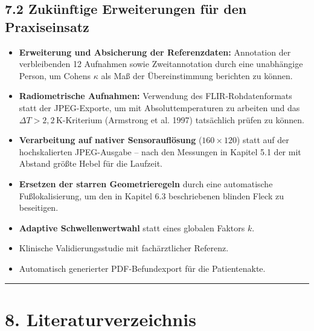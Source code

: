 \documentclass[
  11pt,
]{article}
\providecommand{\tightlist}{%
  \setlength{\itemsep}{0pt}\setlength{\parskip}{0pt}}
\begin{document}
\subsection{7.2 Zukünftige Erweiterungen für den
Praxiseinsatz}\label{zukuxfcnftige-erweiterungen-fuxfcr-den-praxiseinsatz}

\begin{itemize}
\tightlist
\item
  \textbf{Erweiterung und Absicherung der Referenzdaten:} Annotation der
  verbleibenden 12 Aufnahmen sowie Zweitannotation durch eine
  unabhängige Person, um Cohens \(\kappa\) als Maß der Übereinstimmung
  berichten zu können.
\item
  \textbf{Radiometrische Aufnahmen:} Verwendung des FLIR-Rohdatenformats
  statt der JPEG-Exporte, um mit Absoluttemperaturen zu arbeiten und das
  \(\Delta T > 2{,}2\,\)K-Kriterium (Armstrong et al. 1997) tatsächlich
  prüfen zu können.
\item
  \textbf{Verarbeitung auf nativer Sensorauflösung} (\(160 \times 120\))
  statt auf der hochskalierten JPEG-Ausgabe -- nach den Messungen in
  Kapitel 5.1 der mit Abstand größte Hebel für die Laufzeit.
\item
  \textbf{Ersetzen der starren Geometrieregeln} durch eine automatische
  Fußlokalisierung, um den in Kapitel 6.3 beschriebenen blinden Fleck zu
  beseitigen.
\item
  \textbf{Adaptive Schwellenwertwahl} statt eines globalen Faktors
  \(k\).
\item
  Klinische Validierungsstudie mit fachärztlicher Referenz.
\item
  Automatisch generierter PDF-Befundexport für die Patientenakte.
\end{itemize}

\begin{center}\rule{0.5\linewidth}{0.5pt}\end{center}

\section{8. Literaturverzeichnis}\label{literaturverzeichnis}
\end{document}

